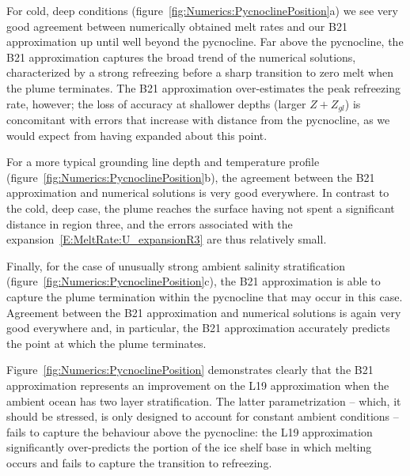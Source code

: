 \documentclass[openacc]{rsproca_new}%
\begin{document}
For cold, deep conditions (figure~\ref{fig:Numerics:PycnoclinePosition}a) we see very good agreement between numerically obtained melt rates and our B21 approximation up until well beyond the pycnocline. Far above the pycnocline,  the B21 approximation captures the broad trend of the numerical solutions, characterized by a strong refreezing before a sharp transition to zero melt when the plume terminates. The B21 approximation over-estimates the peak refreezing rate, however; the loss of accuracy at shallower depths (larger $Z + Z_{gl}$) is concomitant with errors that increase with distance from the pycnocline, as we would expect from having expanded about this point.

For a more typical grounding line depth and temperature profile (figure~\ref{fig:Numerics:PycnoclinePosition}b), the agreement between the B21 approximation and numerical solutions is very good everywhere. In contrast to the cold, deep case, the plume reaches the surface having not spent a significant distance in region three, and the errors associated with the expansion~\eqref{E:MeltRate:U_expansionR3} are thus relatively small.

Finally, for the case of unusually strong ambient salinity stratification (figure~\ref{fig:Numerics:PycnoclinePosition}c), the B21 approximation is able to capture the plume termination within the pycnocline that may occur in this case. Agreement between the B21 approximation and numerical solutions is again very good everywhere and, in particular, the B21 approximation accurately predicts the point at which the plume terminates.

Figure~\ref{fig:Numerics:PycnoclinePosition} demonstrates clearly that the B21 approximation represents an improvement on the L19 approximation when the ambient ocean has two layer stratification. The latter parametrization -- which, it should be stressed, is only designed to account for constant ambient conditions -- fails to capture the behaviour above the pycnocline: the L19 approximation significantly over-predicts the portion of the ice shelf base in which melting occurs and fails to capture the transition to refreezing.
\end{document}
